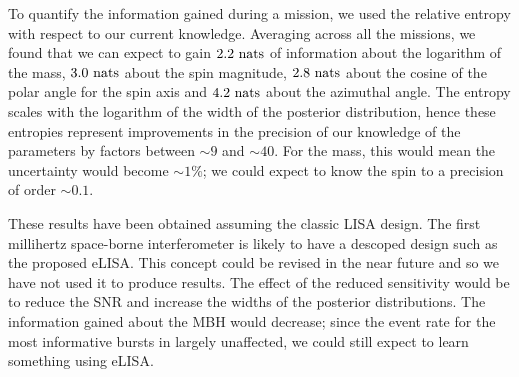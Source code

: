 To quantify the information gained during a mission, we used the relative entropy with respect to our current knowledge. Averaging across all the missions, we found that we can expect to gain $2.2~\mathrm{nats}$ of information about the logarithm of the mass, $3.0~\mathrm{nats}$ about the spin magnitude, $2.8~\mathrm{nats}$ about the cosine of the polar angle for the spin axis and $4.2~\mathrm{nats}$ about the azimuthal angle. The entropy scales with the logarithm of the width of the posterior distribution, hence these entropies represent improvements in the precision of our knowledge of the parameters by factors between $\sim9$ and $\sim40$. For the mass, this would mean the uncertainty would become $\sim1\%$; we could expect to know the spin to a precision of order $\sim0.1$.

These results have been obtained assuming the classic LISA design. The first millihertz space-borne interferometer is likely to have a descoped design such as the proposed eLISA. This concept could be revised in the near future and so we have not used it to produce results. The effect of the reduced sensitivity would be to reduce the SNR and increase the widths of the posterior distributions. The information gained about the MBH would decrease; since the event rate for the most informative bursts in largely unaffected, we could still expect to learn something using eLISA.

